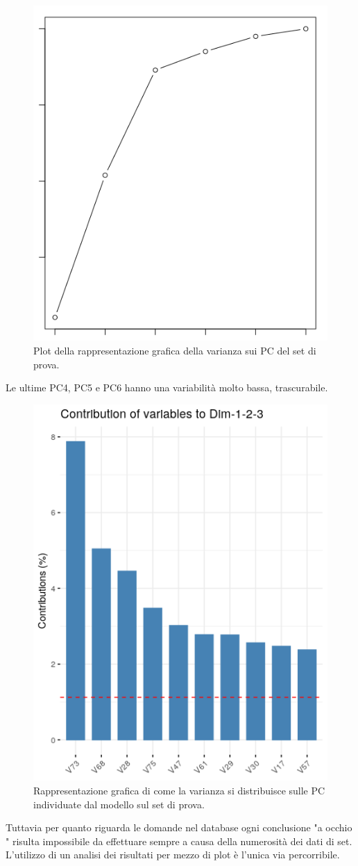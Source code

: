 \begin{figure}[H]
\centering
	\includegraphics[width=0.60\linewidth]{../../PCA/plot/variances2_rete-prova.png}
	\caption{Plot della rappresentazione grafica della varianza sui PC del set di prova.}
	\label{Plot della rappresentazione grafica della varianza sui PC del set di prova.}
\end{figure}
\noindent
Le ultime PC4, PC5 e PC6 hanno una variabilit\`a molto bassa, trascurabile.
\begin{figure}[H]
\centering
	\includegraphics[width=0.60\linewidth]{../../PCA/plot/varianza-complessiva_rete-prova.png}
	\caption{Rappresentazione grafica di come la varianza si distribuisce sulle PC individuate dal modello sul set di prova.}
		\label{Rappresentazione grafica della distribuzione di varianza sulle PC individuate dal modello, sul set di prova.}
\end{figure}
\noindent
Tuttavia per quanto riguarda le domande nel database ogni conclusione "a occhio " risulta  impossibile da effettuare sempre a causa della numerosit\`a dei dati di set. L'utilizzo di un analisi dei risultati per mezzo di plot \`e l'unica via percorribile.

